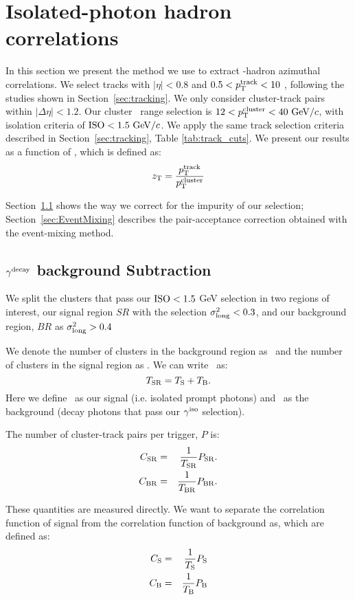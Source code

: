 \section{Isolated-photon hadron correlations}
In this section we present the method we use to extract \gammaiso-hadron azimuthal correlations. We select tracks with $|\eta|<0.8$ and $0.5 <p_{\mathrm{T}}^{\mathrm{track}} < 10$ \GeVc, following the studies shown in Section~\ref{sec:tracking}. We only consider cluster-track pairs within $|\Delta \eta| < 1.2$. Our cluster \pt~range selection is $12 < p_{\mathrm{T}}^{\mathrm{cluster}}< 40\ \mathrm{GeV}/c$, with isolation criteria of $\mathrm{ISO} < 1.5\ \mathrm{GeV}/c$. We apply the same track selection criteria described in Section~\ref{sec:tracking}, Table \ref{tab:track_cuts}. We present our results as a function of \zt, which is defined as:
 \begin{equation}
z_{\mathrm{T}} = \frac{p_{\mathrm{T}}^{\mathrm{track}}}{p_{\mathrm{T}}^{\mathrm{cluster}}}
 \end{equation}

Section~\ref{sec:decaybkgsubtraction} shows the way we correct for the impurity of our \gammaiso selection; Section~\ref{sec:EventMixing} describes the pair-acceptance correction obtained with the event-mixing method.


\subsection{$\gamma^\mathrm{decay}$ background Subtraction}
\label{sec:decaybkgsubtraction}
We split the clusters that pass our $\mathrm{ISO}<1.5 $ GeV selection in two regions of interest, our signal region \(SR\) with the selection $\sigma^{2}_{\mathrm{long}}<0.3$, and our background region, \(BR\) as $\sigma^{2}_{\mathrm{long}}>0.4$ 

We denote the number of clusters in the background region as \TBR~and the number of clusters in the signal region as \TSR. We can write \TSR~as:
\begin{equation}
T_{\mathrm{SR}} = T_{\mathrm{S}} + T_{\mathrm{B}}.
\end{equation}
Here we define \TS~as our signal (i.e. isolated prompt photons) and \TB~as the background (decay photons that pass our $\gamma^\mathrm{iso}$ selection).  

The number of cluster-track pairs per trigger, $P$ is:
\begin{eqnarray}
\label{eq:CSRCBR}
C_{\mathrm{SR}} &=& \frac{1}{T_{\mathrm{SR}}}P_{\mathrm{SR}}.\\
C_{\mathrm{BR}} &=& \frac{1}{T_{\mathrm{BR}} }P_{\mathrm{BR}}.
\end{eqnarray}

These quantities are measured directly. We want to separate the correlation function of signal from the correlation function of background as, which are defined as:
\begin{eqnarray}
C_{\mathrm{S}} &=& \frac{1}{T_{\mathrm{S}}}P_{\mathrm{S}}\\
C_{\mathrm{B}} &=& \frac{1}{T_{\mathrm{B}}}P_{\mathrm{B}}
\end{eqnarray}

